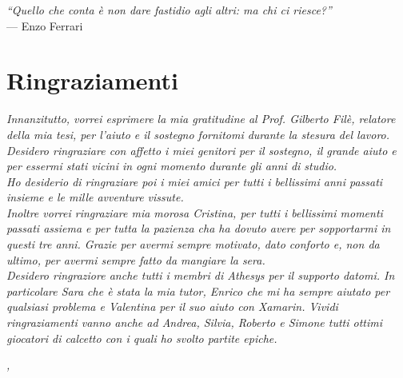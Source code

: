 
\cleardoublepage
{}
{}

\begin{flushright}{
	\slshape    
	``Quello che conta è non dare fastidio agli altri: ma chi ci riesce?''} \\ 
	\medskip
    --- Enzo Ferrari
\end{flushright}


\bigskip

\begingroup
\let\clearpage\relax
\let\cleardoublepage\relax
\let\cleardoublepage\relax

\chapter*{Ringraziamenti}

\noindent \textit{Innanzitutto, vorrei esprimere la mia gratitudine al Prof. Gilberto Filè, relatore della mia tesi, per l'aiuto e il sostegno fornitomi durante la stesura del lavoro.}\\

\noindent \textit{Desidero ringraziare con affetto i miei genitori per il sostegno, il grande aiuto e per essermi stati vicini in ogni momento durante gli anni di studio.}\\

\noindent \textit{Ho desiderio di ringraziare poi i miei amici per tutti i bellissimi anni passati insieme e le mille avventure vissute.}\\

\noindent \textit{Inoltre vorrei ringraziare mia morosa Cristina, per tutti i bellissimi momenti passati assiema e per tutta la pazienza cha ha dovuto avere per sopportarmi in questi tre anni. Grazie per avermi sempre motivato, dato conforto e, non da ultimo, per avermi sempre fatto da mangiare la sera.}\\

\noindent \textit{Desidero ringraziore anche tutti i membri di \emph{Athesys} per il supporto datomi. In particolare Sara che è stata la mia tutor, Enrico che mi ha sempre aiutato per qualsiasi problema e Valentina per il suo aiuto con Xamarin. Vividi ringraziamenti vanno anche ad Andrea, Silvia, Roberto e Simone tutti ottimi giocatori di calcetto con i quali ho svolto partite epiche.}
\bigskip

\noindent\textit{\myLocation, \myTime}
\hfill \myName

\endgroup

